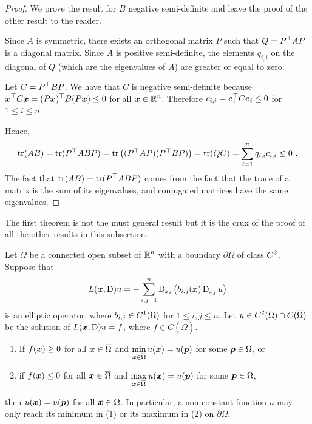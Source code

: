 \begin{proof}
We prove the result for $B$ negative semi-definite and leave the
proof of the other result to the reader.

Since $A$ is symmetric, there exists an orthogonal matrix $P$ such that
$\displaystyle Q = P^\top A P$ is a diagonal matrix.  Since $A$ is positive
semi-definite, the elements $q_{i,i}$ on the diagonal of $Q$ (which
are the eigenvalues of $A$) are greater or equal to zero.

Let $\displaystyle C = P^\top B P$.  We have that $C$ is negative
semi-definite because\\
$\displaystyle {\bm{x}}^\top C {\bm{x}} = (P{\bm{x}})^\top B (P {\bm{x}}) \leq 0$
for all $\displaystyle {\bm{x}} \in \mathbb{R}^n$.  Therefore
$\displaystyle c_{i,i} = {\bm{e}}_i^\top C {\bm{e}}_i \leq 0$
for $1\leq i \leq n$.

Hence,
\[
  \operatorname{tr}(AB) = \operatorname{tr}(P^\top AB P) = \operatorname{tr}\big( (P^\top A P) (P^\top B P)\big)
  = \operatorname{tr}(Q C) = \sum_{i=1}^n q_{i,i} c_{i,i} \leq 0 \ .
\]
The fact that $\displaystyle \operatorname{tr}(AB) = \operatorname{tr}(P^\top AB P)$ comes from
the fact that the trace of a \nn matrix is the sum of its eigenvalues,
and conjugated matrices have the same eigenvalues.
\end{proof}

The first theorem is not the must general result but it is the crux of
the proof of all the other results in this subsection.

\begin{theorem} \label{ellStrongMaxA}
Let $\Omega$ be a connected open subset of $\displaystyle \mathbb{R}^n$ with a boundary
$\partial \Omega$ of class $\displaystyle C^2$.  Suppose that
\[
L({\bm{x}},\operatorname{D})u = - \sum_{i,j=1}^n
\operatorname{D}_{x_i} \left( b_{i,j}({\bm{x}}) \operatorname{D}_{x_j} u \right)
\]
is an elliptic operator, where
$\displaystyle b_{i,j} \in C^1(\overline{\Omega})$
for $1 \leq i,j\leq n$.
Let $\displaystyle u \in C^2(\Omega) \cap C(\overline{\Omega})$ be the
solution of $L({\bm{x}},\operatorname{D})u = f$, where $f \in C(\overline{\Omega})$.
\begin{enumerate}
\item If $f({\bm{x}}) \geq 0$ for all ${\bm{x}} \in \overline{\Omega}$
and $\displaystyle \min_{{\bm{x}}\in \overline{\Omega}} u({\bm{x}}) = u({\bm{p}})$
for some ${\bm{p}} \in \Omega$, or
\item if $f({\bm{x}}) \leq 0$ for all ${\bm{x}} \in \overline{\Omega}$
and $\displaystyle \max_{{\bm{x}}\in \overline{\Omega}} u({\bm{x}}) = u({\bm{p}})$
for some ${\bm{p}} \in \Omega$,
\end{enumerate}
then $u({\bm{x}})= u({\bm{p}})$ for all ${\bm{x}} \in \Omega$.  In
particular, a non-constant function $u$ may only reach its minimum in
(1) or its maximum in (2) on $\partial \Omega$.
\end{theorem}

